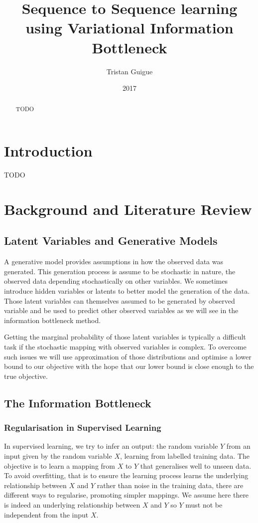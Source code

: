 \documentclass[10pt,oneside,openright]{report}
\title{Sequence to Sequence learning using Variational Information Bottleneck}
\author{Tristan Guigue}
\date{2017}
\begin{document}
\maketitle

\declaration

\begin{abstract}
TODO
\end{abstract}

\tableofcontents

\chapter{Introduction}

TODO
\chapter{Background and Literature Review}
\section{Latent Variables and Generative Models}

A generative model provides assumptions in how the observed data was generated. This generation process is assume to be stochastic in nature, the observed data depending stochastically on other variables. We sometimes introduce hidden variables or latents to better model the generation of the data. Those latent variables can themselves assumed to be generated by observed variable and be used to predict other observed variables as we will see in the information bottleneck method. 

Getting the marginal probability of those latent variables is typically a difficult task if the stochastic mapping with observed variables is complex. To overcome such issues we will use approximation of those distributions and optimise a lower bound to our objective with the hope that our lower bound is close enough to the true objective.

\section{The Information Bottleneck}
\subsection{Regularisation in Supervised Learning}
In supervised learning, we try to infer an output: the random variable $Y$ from an input given by the random variable $X$, learning from labelled training data. The objective is to learn a mapping from $X$ to $Y$ that generalises well to unseen data. To avoid overfitting, that is to ensure the learning process learns the underlying relationship between $X$ and $Y$ rather than noise in the training data, there are different ways to regularise, promoting simpler mappings. We assume here there is indeed an underlying relationship between $X$ and $Y$ so $Y$ must not be independent from the input $X$.
\end{document}
